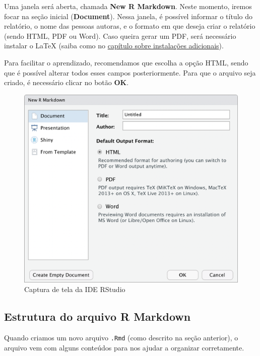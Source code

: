 \documentclass[
]{book}
\begin{document}
Uma janela será aberta, chamada \textbf{New R Markdown}. Neste momento, iremos focar na seção inicial (\textbf{Document}). Nessa janela, é possível informar o título do relatório, o nome das pessoas autoras, e o formato em que deseja criar o relatório (sendo HTML, PDF ou Word). Caso queira gerar um PDF, será necessário instalar o LaTeX (saiba como no \protect\hyperlink{instalacao-latex}{capítulo sobre instalações adicionais}).

Para facilitar o aprendizado, recomendamos que escolha a opção HTML, sendo que é possível alterar todos esses campos posteriormente. Para que o arquivo seja criado, é necessário clicar no botão \textbf{OK}.

\begin{figure}

{\centering \includegraphics[width=16.28in]{assets/img/relatorios/criar-rmd-2} 

}

\caption{Captura de tela da IDE RStudio}\label{fig:unnamed-chunk-2}
\end{figure}

\hypertarget{estrutura-do-arquivo-r-markdown}{%
\subsection{Estrutura do arquivo R Markdown}\label{estrutura-do-arquivo-r-markdown}}

Quando criamos um novo arquivo \texttt{.Rmd} (como descrito na seção anterior), o arquivo vem com alguns conteúdos para nos ajudar a organizar corretamente.
\end{document}
